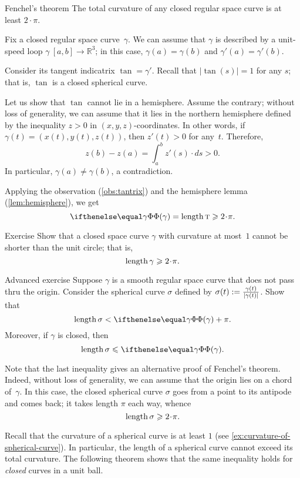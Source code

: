 \begin{thm}{Fenchel's theorem}
\label{thm:fenchel}
The total curvature of any closed regular space curve is at least $2\cdot\pi$.
\end{thm}

Fix a closed regular space curve~$\gamma$.
We can assume that $\gamma$ is described by a unit-speed loop $\gamma\:[a,b]\to \mathbb{R}^3$;
in this case, $\gamma(a)=\gamma(b)$ and $\gamma'(a)=\gamma'(b)$.

Consider its tangent indicatrix $\tan=\gamma'$.
Recall that $|\tan(s)|=1$ for any $s$; that is, $\tan$ is a closed spherical curve.

Let us show that $\tan$ cannot lie in a hemisphere.
Assume the contrary; without loss of generality, we can assume that it lies in the northern hemisphere defined by the inequality $z>0$ in $(x,y,z)$-coordinates.
In other words, if $\gamma(t)=(x(t), y(t), z(t))$, then $z'(t)>0$ for any~$t$.
Therefore,
\[z(b)-z(a)=\int_a^b z'(s)\cdot ds>0.\]
In particular, $\gamma(a)\ne \gamma(b)$, a contradiction.

Applying the observation (\ref{obs:tantrix}) and the hemisphere lemma (\ref{lem:hemisphere}), we get  
\[\tc\gamma=\length \tan\ge2\cdot\pi.\]
\qedsf

\begin{thm}{Exercise}\label{ex:length>=2pi}
Show that a closed space curve $\gamma$ with curvature at most~$1$ cannot be shorter than the unit circle;
that is, 
\[\length\gamma\ge 2\cdot \pi.\]

\end{thm}


\begin{thm}{Advanced exercise}\label{ex:gamma/|gamma|}
Suppose $\gamma$ is a smooth regular space curve that does not pass thru the origin.
Consider the spherical curve $\sigma$ defined by $\sigma(t)\mathrel{:=}\frac{\gamma(t)}{|\gamma(t)|}$.
Show that 
\[\length \sigma< \tc\gamma+\pi.\]
Moreover, if $\gamma$ is closed, then
\[\length \sigma\le \tc\gamma.\]
\end{thm}

Note that the last inequality gives an alternative proof of Fenchel's theorem.
Indeed, without loss of generality, we can assume that the origin lies on a chord of~$\gamma$.
In this case, the closed spherical curve $\sigma$ goes from a point to its antipode and comes back; 
it takes length $\pi$ each way, 
whence 
\[\length\sigma\ge 2\cdot\pi.\]

Recall that the curvature of a spherical curve is at least $1$
(see \ref{ex:curvature-of-spherical-curve}).
In particular, the length of a spherical curve cannot exceed its total curvature.
The following theorem shows that the same inequality holds for {}\emph{closed} curves in a unit ball.

